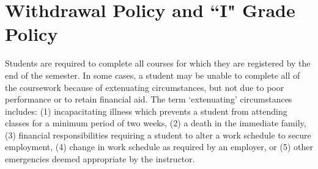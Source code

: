 \documentclass[11pt]{article}\usepackage[]{graphicx}\usepackage[]{xcolor}
\begin{document}
\section{Withdrawal Policy and ``I" Grade Policy}

Students are required to complete all courses for which they are registered by the end of the semester. In some cases, a student may be unable to complete all of the coursework because of extenuating circumstances, but not due to poor performance or to retain financial aid. The term ‘extenuating’ circumstances includes: (1) incapacitating illness which prevents a student from attending classes for a minimum period of two weeks, (2) a death in the immediate family, (3) financial responsibilities requiring a student to alter a work schedule to secure employment, (4) change in work schedule as required by an employer, or (5) other emergencies deemed appropriate by the instructor.
\end{document}
